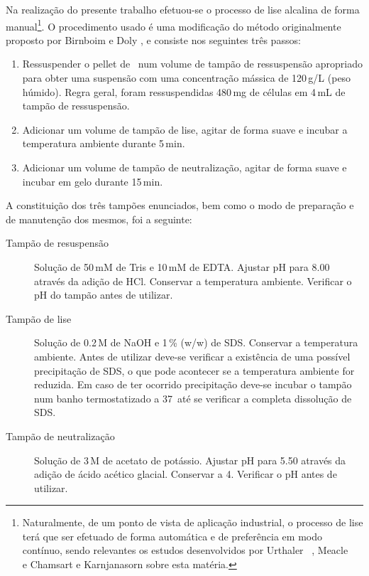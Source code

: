 Na realização do presente trabalho efetuou-se o processo de lise alcalina de forma manual\footnote{Naturalmente, de um ponto de vista de aplicação industrial, o processo de lise terá que ser efetuado de forma automática e de preferência em modo contínuo, sendo relevantes os estudos desenvolvidos por Urthaler \et\ \cite{urthaler}, Meacle \et\ \cite{meacle} e Chamsart e Karnjanasorn \cite{staticmixer} sobre esta matéria.}. O procedimento usado é uma modificação do método originalmente proposto por Birnboim e Doly \cite{birnboim}, e consiste nos seguintes três passos:
\begin{enumerate}
	\item Ressuspender o pellet de \ecoli\ num volume de tampão de ressuspensão apropriado para obter uma suspensão com uma concentração mássica de 120\,g/L (peso húmido). Regra geral, foram ressuspendidas 480\,mg de células em 4\,mL de tampão de ressuspensão.
	\item Adicionar um volume de tampão de lise, agitar de forma suave e incubar a temperatura ambiente durante 5\,min.
	\item Adicionar um volume de tampão de neutralização, agitar de forma suave e incubar em gelo durante 15\,min. 
\end{enumerate}
\renewcommand\descriptionlabel[1]{\hspace{\labelsep}\textbf{#1}}
A constituição dos três tampões enunciados, bem como o modo de preparação e de manutenção dos mesmos, foi a seguinte:
\begin{description}
	\item[Tampão de resuspensão] Solução de 50\,mM de Tris e 10\,mM de EDTA. Ajustar pH para 8.00 através da adição de HCl. Conservar a temperatura ambiente. Verificar o pH do tampão antes de utilizar.
	\item[Tampão de lise] Solução de 0.2\,M de NaOH e 1\,\% (w/w) de SDS. Conservar a temperatura ambiente. Antes de utilizar deve-se verificar a existência de uma possível precipitação de SDS, o que pode acontecer se a temperatura ambiente for reduzida. Em caso de ter ocorrido precipitação deve-se incubar o tampão num banho termostatizado a 37\degreecelsius\ até se verificar a completa dissolução de SDS.
	\item[Tampão de neutralização] Solução de 3\,M de acetato de potássio. Ajustar pH para 5.50 através da adição de ácido acético glacial. Conservar a 4\degreecelsius. Verificar o pH antes de utilizar. 
\end{description}%
